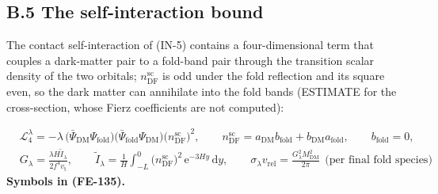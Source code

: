 \documentclass[
  10pt,
]{article}
\begin{document}
\hypertarget{b.5-the-self-interaction-bound}{%
\subsection*{B.5 The self-interaction
bound}\label{b.5-the-self-interaction-bound}}

The contact self-interaction of (IN-5) contains a four-dimensional term
that couples a dark-matter pair to a fold-band pair through the
transition scalar density of the two orbitals;
\(n^{\mathrm{sc}}_{\mathrm{DF}}\) is odd under the fold reflection and
its square even, so the dark matter can annihilate into the fold bands
(ESTIMATE for the cross-section, whose Fierz coefficients are not
computed):

\[
\begin{aligned}
&\mathcal{L}_4^{\lambda} =
 -\lambda\,\big(\bar\Psi_{\mathrm{DM}}\Psi_{\mathrm{fold}}\big)\big(\bar\Psi_{\mathrm{fold}}\Psi_{
 \mathrm{DM}}\big)
 \big(n^{\mathrm{sc}}_{\mathrm{DF}}\big)^2,\qquad n^{\mathrm{sc}}_{\mathrm{DF}} =
 a_{\mathrm{DM}}b_{\mathrm{fold}} + b_{\mathrm{DM}}a_{\mathrm{fold}},
 \qquad b_{\mathrm{fold}} = 0,\\
&G_\lambda = \frac{\lambda H\tilde I_\lambda}{2f^4v_{\mathrm{t}}},\qquad
 \tilde I_\lambda = \frac{1}{H}\int_{-L}^{0}\big(n^{\mathrm{sc}}_{\mathrm{DF}}\big)^2\,
 \mathrm{e}^{-3Hy}\,\mathrm{d}y,\qquad
 \sigma_\lambda v_{\mathrm{rel}} = \frac{G_\lambda^2M_{\mathrm{DM}}^2}{2\pi}\ \ \text{(per final fold
 species)}
\end{aligned} \tag{FE-135}
\] \textbf{Symbols in (FE-135).}
\end{document}
